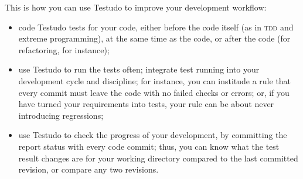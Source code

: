 \documentclass[twoside, a4paper, article]{memoir}
\begin{document}
This is how you can use Testudo to improve your development workflow:
\begin{itemize}
\item code Testudo tests for your code, either before the code itself (as in
  \textsc{tdd} and extreme programming), at the same time as the code, or after
  the code (for refactoring, for instance);
\item use Testudo to run the tests often; integrate test running into your
  development cycle and discipline; for instance, you can institude a rule that
  every commit must leave the code with no failed checks or errors; or, if you
  have turned your requirements into tests, your rule can be about never
  introducing regressions;
\item use Testudo to check the progress of your development, by committing the
  report status with every code commit; thus, you can know what the test result
  changes are for your working directory compared to the last committed
  revision, or compare any two revisions.
\end{itemize}
\end{document}

